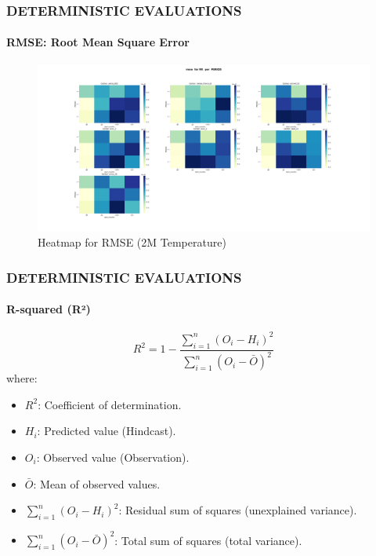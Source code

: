 \begin{frame}
\frametitle{DETERMINISTIC EVALUATIONS}
\framesubtitle{RMSE: Root Mean Square Error}
\begin{figure}[H]
    \centering
    \includegraphics[width=1\linewidth]{rmse_RR_ PERIOD.png}
    \caption{Heatmap for RMSE (2M Temperature)}
    \label{fig:rmse-heatmap}
\end{figure}
\end{frame}

\begin{frame}
\frametitle{DETERMINISTIC EVALUATIONS}
\framesubtitle{R-squared (R²)}

\[
R^2 = 1 - \frac{\sum_{i=1}^n (O_i - H_i)^2}{\sum_{i=1}^n (O_i - \bar{O})^2}
\]
where:
\begin{itemize}
    \item \( R^2 \): Coefficient of determination.
    \item \( H_i \): Predicted value (Hindcast).
    \item \( O_i \): Observed value (Observation).
    \item \( \bar{O} \): Mean of observed values.
    \item \( \sum_{i=1}^n (O_i - H_i)^2 \): Residual sum of squares (unexplained variance).
    \item \( \sum_{i=1}^n (O_i - \bar{O})^2 \): Total sum of squares (total variance).
\end{itemize}
\end{frame}

